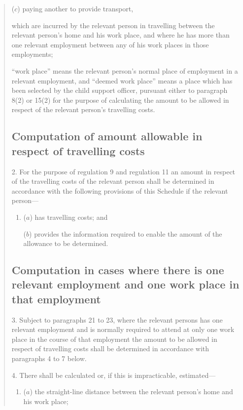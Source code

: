 \documentclass[a4paper]{article}
\begin{document}
\begin{quotation}
\begin{enumerate}
\begin{enumerate}
($c$) paying another to provide transport,
\end{enumerate}
which are incurred by the relevant person in travelling between the relevant person’s home and his work place, and where he has more than one relevant employment between any of his work places in those employments;

“work place” means the relevant person’s normal place of employment in a relevant employment, and “deemed work place” means a place which has been selected by the child support officer, pursuant either to paragraph 8(2) or 15(2) for the purpose of calculating the amount to be allowed in respect of the relevant person’s travelling costs.
\end{enumerate}

\subsection*{Computation of amount allowable in respect of travelling costs}

2.  For the purpose of regulation 9 and regulation 11 an amount in respect of the travelling costs of the relevant person shall be determined in accordance with the following provisions of this Schedule if the relevant person—
\begin{enumerate}\item[]
($a$) has travelling costs; and

($b$) provides the information required to enable the amount of the allowance to be determined.
\end{enumerate}

\subsection*{Computation in cases where there is one relevant employment and one work place in that employment}

3.  Subject to paragraphs 21 to 23, where the relevant persons has one relevant employment and is normally required to attend at only one work place in the course of that employment the amount to be allowed in respect of travelling costs shall be determined in accordance with paragraphs 4 to 7 below.

\medskip

4.  There shall be calculated or, if this is impracticable, estimated—
\begin{enumerate}\item[]
($a$) the straight-line distance between the relevant person’s home and his work place;


\end{enumerate}
\end{quotation}
\end{document}
